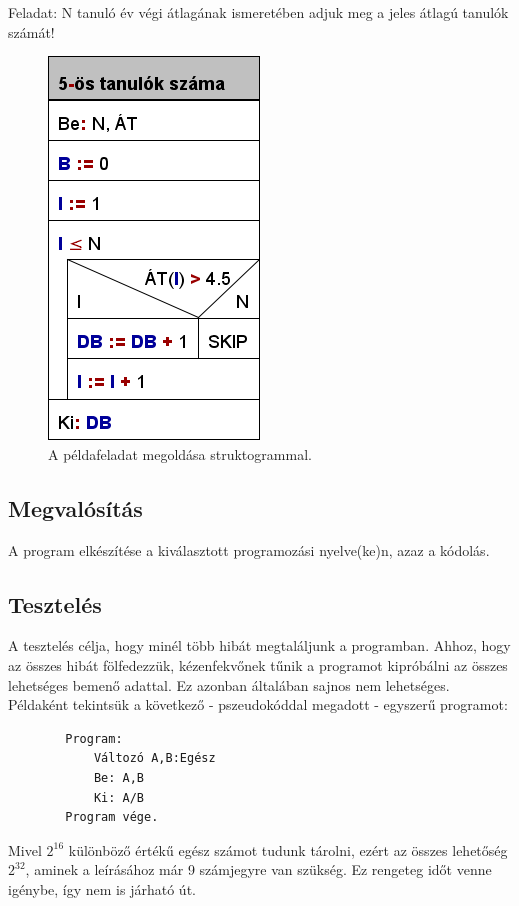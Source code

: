 \documentclass[12pt,margin=0px]{article}
\begin{document}
	\noindent Feladat: N tanuló év végi átlagának ismeretében adjuk meg a jeles átlagú tanulók számát!
	
		\begin{figure}[H]
			\centering
			\includegraphics[width=0.3\linewidth]{img/stuki_pelda}
			\caption{A példafeladat megoldása struktogrammal.}
			\label{fig:stuki_pelda}
		\end{figure}
	
	\subsection*{Megvalósítás}
	
		A program elkészítése a kiválasztott programozási nyelve(ke)n, azaz a kódolás.
    \newpage

	\subsection*{Tesztelés}

    A tesztelés célja, hogy minél több hibát megtaláljunk a programban. Ahhoz, hogy az összes hibát fölfedezzük, kézenfekvőnek tűnik a programot kipróbálni az összes lehetséges bemenő adattal. Ez azonban általában sajnos nem lehetséges.\\
		
	\noindent Példaként tekintsük a következő - pszeudokóddal megadott - egyszerű programot:
		
	\begin{verbatim}
		Program:
		    Változó A,B:Egész
		   	Be: A,B
		    Ki: A/B
		Program vége.
	\end{verbatim}
		
    \noindent Mivel $2^{16}$ különböző értékű egész számot tudunk tárolni, ezért az összes lehetőség $2^{32}$, aminek a leírásához már 9 számjegyre van szükség. Ez rengeteg időt venne igénybe, így nem is járható út.\\
	
\end{document}
